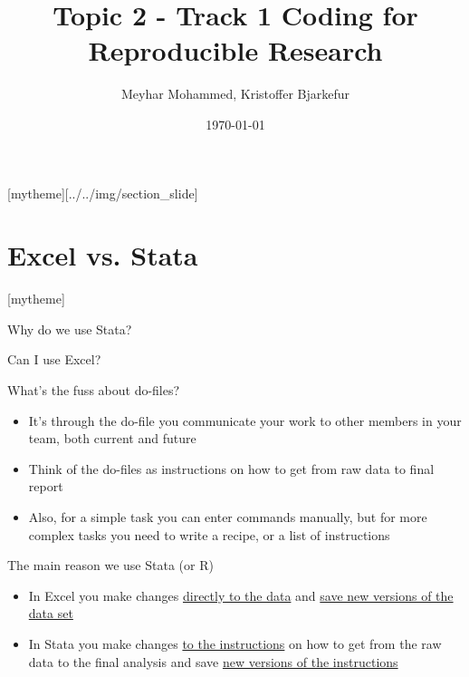\documentclass[aspectratio=169]{beamer}
\title{Topic 2 - Track 1 \newline Coding for Reproducible Research}
\date{\today}
\author{Meyhar Mohammed, Kristoffer Bjarkefur} %
\institute{Development Impact Evaluation (DIME) \newline The World Bank }
\newcommand{\sectionpic}[2]{
	\setbeamertemplate{section page}[mytheme][#2]
	\section{#1}
	\setbeamertemplate{section page}[mytheme]
}
\begin{document}
{
	\maketitle
}

\sectionpic{Excel vs. Stata}{../../img/section_slide}


\begin{frame}{Why do we use Stata?}
\begin{center}
	\huge Can I use Excel?
\end{center}

\end{frame}


\begin{frame}{What's the fuss about do-files?}

\begin{itemize}
	\item It’s through the do-file you communicate your work to other members in your team, both current and future

	\item Think of the do-files as instructions on how to get from raw data to final report

	\item Also, for a simple task you can enter commands manually, but for more complex tasks you need to write a recipe, or a list of instructions

\end{itemize}
\end{frame}

\begin{frame}{The main reason we use Stata (or R)}
\begin{itemize}

	\item In Excel you make changes \underline{directly to the data} and \underline{save new versions of the data set}

	\item In Stata you make changes \underline{to the instructions} on how to get from the raw data to the final analysis and save \underline{new versions of the instructions}
\end{itemize}
\end{frame}
\end{document}
